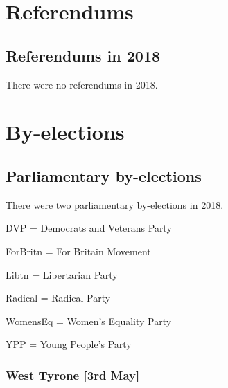 \documentclass[a4paper,openany]{book}
\begin{document}
 
 



\part{Referendums}

\chapter{Referendums in 2018}

There were no referendums in 2018.

%
%

\part{By-elections}

\chapter{Parliamentary by-elections}

There were two parliamentary by-elections in 2018.

DVP = Democrats and Veterans Party

ForBritn = For Britain Movement

Libtn = Libertarian Party

Radical = Radical Party

WomensEq = Women's Equality Party

YPP = Young People's Party
%
%
%
\section*{West Tyrone \hspace*{\fill}\nolinebreak[1]%
\enspace\hspace*{\fill}
[3rd May]}
\end{document}
